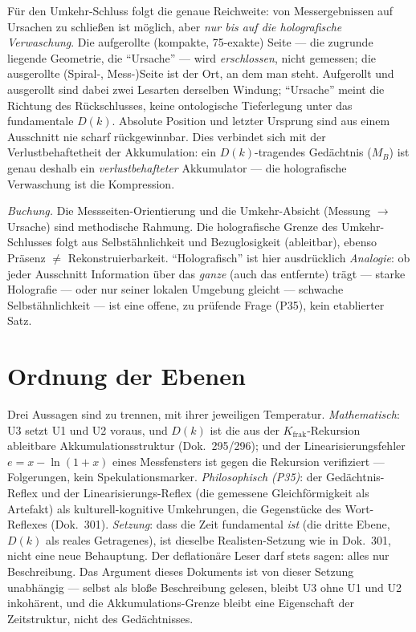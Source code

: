 Für den Umkehr-Schluss folgt die genaue Reichweite: von Messergebnissen auf Ursachen zu
schließen ist möglich, aber \emph{nur bis auf die holografische Verwaschung}. Die aufgerollte
(kompakte, 75-exakte) Seite --- die zugrunde liegende Geometrie, die \enquote{Ursache} ---
wird \emph{erschlossen}, nicht gemessen; die ausgerollte (Spiral-, Mess-)Seite ist der Ort, an
dem man steht. Aufgerollt und ausgerollt sind dabei zwei Lesarten derselben Windung;
\enquote{Ursache} meint die Richtung des Rückschlusses, keine ontologische Tieferlegung unter
das fundamentale $D(k)$. Absolute Position und letzter Ursprung sind aus einem Ausschnitt nie scharf
rückgewinnbar. Dies verbindet sich mit der Verlustbehaftetheit der Akkumulation: ein
$D(k)$-tragendes Gedächtnis ($M_B$) ist genau deshalb ein \emph{verlustbehafteter}
Akkumulator --- die holografische Verwaschung ist die Kompression.

\emph{Buchung.} Die Messseiten-Orientierung und die Umkehr-Absicht (Messung $\to$ Ursache)
sind methodische Rahmung. Die holografische Grenze des Umkehr-Schlusses folgt aus
Selbstähnlichkeit und Bezuglosigkeit (ableitbar), ebenso Präsenz $\neq$ Rekonstruierbarkeit.
\enquote{Holografisch} ist hier ausdrücklich \emph{Analogie}: ob jeder Ausschnitt Information
über das \emph{ganze} (auch das entfernte) trägt --- starke Holografie --- oder nur seiner
lokalen Umgebung gleicht --- schwache Selbstähnlichkeit --- ist eine offene, zu prüfende Frage
(P35), kein etablierter Satz.

\section{Ordnung der Ebenen}

Drei Aussagen sind zu trennen, mit ihrer jeweiligen Temperatur. \emph{Mathematisch}: U3
setzt U1 und U2 voraus, und $D(k)$ ist die aus der $K_{\text{frak}}$-Rekursion ableitbare
Akkumulationsstruktur (Dok.~295/296); und der Linearisierungsfehler $e=x-\ln(1+x)$ eines
Messfensters ist gegen die Rekursion verifiziert --- Folgerungen, kein Spekulationsmarker.
\emph{Philosophisch (P35)}: der Gedächtnis-Reflex und der Linearisierungs-Reflex
(die gemessene Gleichförmigkeit als Artefakt) als kulturell-kognitive Umkehrungen, die
Gegenstücke des Wort-Reflexes (Dok.~301). \emph{Setzung}: dass die Zeit fundamental
\emph{ist} (die dritte Ebene, $D(k)$ als reales Getragenes), ist dieselbe Realisten-Setzung
wie in Dok.~301, nicht eine neue Behauptung. Der deflationäre Leser darf stets sagen: alles
nur Beschreibung. Das Argument dieses Dokuments ist von dieser Setzung unabhängig ---
selbst als bloße Beschreibung gelesen, bleibt U3 ohne U1 und U2 inkohärent, und die
Akkumulations-Grenze bleibt eine Eigenschaft der Zeitstruktur, nicht des Gedächtnisses.

